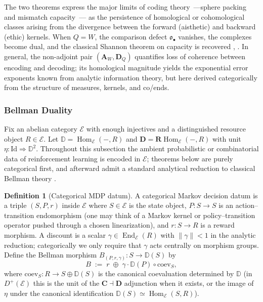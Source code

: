 \documentclass[12pt]{article}
\newcommand{\E}{\mathcal{E}}
\newcommand{\DD}{\mathbb{D}}
\newcommand{\Hom}{\operatorname{Hom}}
\newcommand{\End}{\operatorname{End}}
\newcommand{\RHom}{\mathbf{R}\!\operatorname{Hom}}
\newcommand{\coev}{\mathrm{coev}}
\theoremstyle{plain}
\theoremstyle{definition}
\newtheorem{definition}[theorem]{Definition}
\theoremstyle{remark}
\numberwithin{equation}{section}
\begin{document}
The two theorems express the major limits of coding theory~---sphere packing and mismatch capacity~--- as the persistence of homological or cohomological classes arising from the divergence between the forward (aisthetic) and backward (ethic) kernels.  
When $Q=W$, the comparison defect $\mathfrak o_\bullet$ vanishes, the complexes become dual, and the classical Shannon theorem on capacity is recovered \cite{Gallager1968}, \cite{CsiszarKorner2011}.  
In general, the non-adjoint pair $(\mathbf A_W,\mathbf D_Q)$ quantifies loss of coherence between encoding and decoding; its homological magnitude yields the exponential error exponents known from analytic information theory, but here derived categorically from the structure of measures, kernels, and co/ends.

\subsubsection{Bellman Duality}

Fix an abelian category $\E$ with enough injectives and a distinguished resource object $R\in \E$. Let $\DD=\Hom_{\E}(-,R)$ and $\mathbf D=\RHom_{\E}(-,R)$ with unit $\eta:\mathrm{Id}\Rightarrow \DD^2$. Throughout this subsection the ambient probabilistic or combinatorial data of reinforcement learning is encoded in $\E$; theorems below are purely categorical first, and afterward admit a standard analytical reduction to classical Bellman theory \cite{Bellman1957,BertsekasTsitsiklis1996,Puterman1994}.

\begin{definition}[Categorical MDP datum]
A categorical Markov decision datum is a triple $(S,P,r)$ inside $\E$ where $S\in \E$ is the state object, $P:S\to S$ is an action–transition endomorphism (one may think of a Markov kernel or policy–transition operator pushed through a chosen linearization), and $r:S\to R$ is a reward morphism. A discount is a scalar $\gamma\in \End_{\E}(R)$ with $\|\gamma\|<1$ in the analytic reduction; categorically we only require that $\gamma$ acts centrally on morphism groups. Define the Bellman morphism $B_{(P,r,\gamma)}:S\to \DD(S)$ by
\[
B \;:=\; r\;\oplus\; \gamma\cdot \DD(P)\circ \coev_S,
\]
where $\coev_S:R\to S\oplus \DD(S)$ is the canonical coevaluation determined by $\DD$ (in $D^{+}(\E)$ this is the unit of the $\mathbf C\dashv\mathbf D$ adjunction when it exists, or the image of $\eta$ under the canonical identification $\DD(S)\simeq \Hom_{\E}(S,R)$).
\end{definition}
\end{document}
